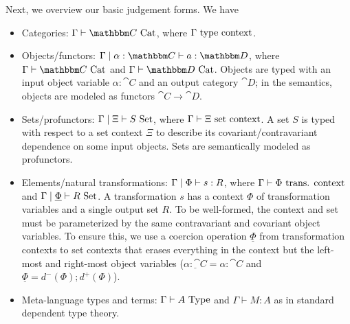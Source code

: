 \documentclass{llncs}
\begin{document}
Next, we overview our basic judgement forms.  We have
\begin{itemize}
\item Categories: ${\Gamma\vdash \cat C \isaCat}$, where ${\Gamma \,\,\textrm{type context}}$.
  
\item Objects/functors: ${\Gamma \pipe \alpha : \cat C \vdash a : \cat
  D}$, where $\Gamma \vdash \cat C\isaCat$ and $\Gamma \vdash \cat D
  \isaCat$.  Objects are typed with an input object variable $\alpha :
  \cat C$ and an output category $\cat D$; in the semantics, objects are
  modeled as functors $\cat C \to \cat D$.
  
\item Sets/profunctors: ${\Gamma \mathrel{|} \Xi \vdash S \,\,\textrm{Set}}$, where
  $\Gamma \vdash \Xi \,\,\textrm{set context}$. A set $S$ is typed with respect to a set
  context $\Xi$ to describe its covariant/contravariant dependence on
  some input objects. Sets are semantically modeled as profunctors.
  
\item Elements/natural transformations: ${\Gamma \mathrel{|} \Phi \vdash s :
  R}$, where ${\Gamma \vdash \Phi \,\,\textrm{trans. context}}$ and $\Gamma\mathrel{|}
  \underline \Phi \vdash R \,\,\textrm{Set}$.  A transformation $s$ has a context
  $\Phi$ of transformation variables and a single output set $R$. To be
  well-formed, the context and set must be parameterized by the same
  contravariant and covariant object variables. To ensure this, we use a
  coercion operation $\underline \Phi$ from transformation contexts to
  set contexts that erases everything in the context but the left-most
  and right-most object variables ($\underline{\alpha : \cat C} = \alpha
  : \cat C$ and $\underline{\Phi} = d^-(\Phi);d^+(\Phi)$).

\item Meta-language types and terms: $\Gamma \vdash A \,\,\textrm{Type}$ and
  $\Gamma \vdash M : A$ as in standard dependent type theory.
\end{itemize}



\end{document}
